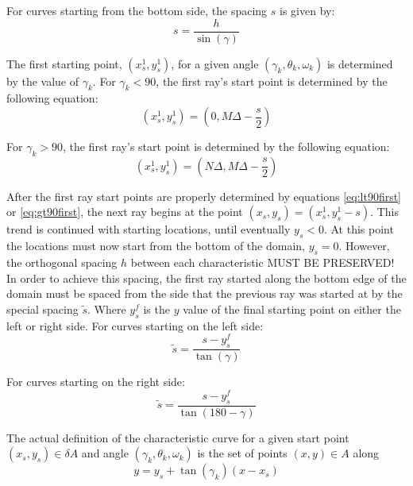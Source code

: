 \documentclass{article}
\begin{document}
For curves starting from the bottom side, the spacing $s$ is given by:
\begin{equation}
s=\frac{h}{\sin({\gamma})}
\label{eq:botspacing}
\end{equation}

The first starting point, $(x_s^1,y_s^1)$, for a given angle $(\gamma_k,\theta_k,\omega_k)$ is determined by the value of $\gamma_k$. 
For $\gamma_k<90$, the first ray's start point is determined by the following equation:
\begin{equation}
(x_s^1,y_s^1)=(0,M\Delta -\frac{s}{2})
\label{eq:lt90first}
\end{equation}

For $\gamma_k>90$, the first ray's start point is determined by the following equation:
\begin{equation}
(x_s^1,y_s^1)=(N\Delta,M\Delta -\frac{s}{2})
\label{eq:gt90first}
\end{equation}

After the first ray start points are properly determined by equations \ref{eq:lt90first} or \ref{eq:gt90first}, the next ray begins at the point $(x_s,y_s) = (x_s^1,y_s^1-s)$. 
This trend is continued with starting locations, until eventually $y_s<0$.
At this point the locations must now start from the bottom of the domain, $y_s=0$. 
However, the orthogonal spacing $h$ between each characteristic MUST BE PRESERVED!
In order to achieve this spacing, the first ray started along the bottom edge of the domain must be spaced from the side that the previous ray was started at by the special spacing $\tilde{s}$.
Where $y_s^f$ is the $y$ value of the final starting point on either the left or right side. For curves starting on the left side:
\begin{equation}
\tilde{s}=\frac{s-y_s^f}{\tan(\gamma)}
\label{eq:firstbotspace}
\end{equation}

For curves starting on the right side:
\begin{equation}
\tilde{s}=\frac{s-y_s^f}{\tan(180-\gamma)}
\label{eq:secondbotspace}
\end{equation}

The actual definition of the characteristic curve for a given start point $(x_s,y_s)\in \delta A$ and angle $(\gamma_k,\theta_k,\omega_k)$ is the set of points $(x,y)\in A$ along 
\begin{equation}
y=y_s+\tan{(\gamma_k)}(x-x_s)
\label{eq:curvedef}
\end{equation}
\end{document}
